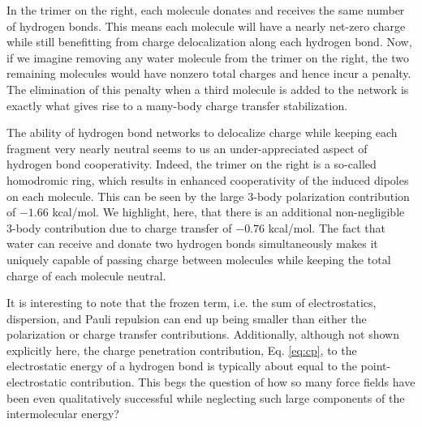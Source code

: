 \documentclass[journal=jctcce,manuscript=article]{achemso}
\begin{document}
In the trimer on the right, each molecule donates and receives the same number of hydrogen bonds. This means each molecule will have a nearly net-zero charge while still benefitting from charge delocalization along each hydrogen bond. Now, if we imagine removing any water molecule from the trimer on the right, the two remaining molecules would have nonzero total charges and hence incur a penalty. The elimination of this penalty when a third molecule is added to the network is exactly what gives rise to a many-body charge transfer stabilization.

The ability of hydrogen bond networks to delocalize charge while keeping each fragment very nearly neutral seems to us an under-appreciated aspect of hydrogen bond cooperativity. Indeed, the trimer on the right is a so-called homodromic ring, which results in enhanced cooperativity of the induced dipoles on each molecule.\cite{xantheas2000cooperativity} This can be seen by the large 3-body polarization contribution of $-1.66$ kcal/mol. We highlight, here, that there is an additional non-negligible 3-body contribution due to charge transfer of $-0.76$ kcal/mol. The fact that water can receive and donate two hydrogen bonds simultaneously makes it uniquely capable of passing charge between molecules while keeping the total charge of each molecule neutral.

It is interesting to note that the frozen term, i.e. the sum of electrostatics, dispersion, and Pauli repulsion can end up being smaller than either the polarization or charge transfer contributions. Additionally, although not shown explicitly here, the charge penetration contribution, Eq. \ref{eq:cp}, to the electrostatic energy of a hydrogen bond is typically about equal to the point-electrostatic contribution. This begs the question of how so many force fields have been even qualitatively successful while neglecting such large components of the intermolecular energy?
\end{document}
